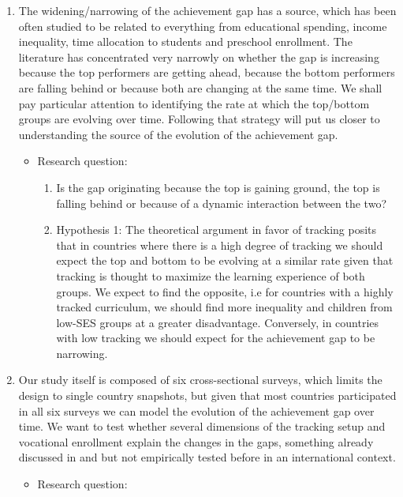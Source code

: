 \documentclass[11pt, a4paper]{article}\usepackage[]{graphicx}\usepackage[]{color}
\begin{document}
\begin{enumerate}
\item The widening/narrowing of the achievement gap has a source, which has been often studied to be related to everything from educational spending, income inequality, time allocation to students and preschool enrollment. The literature has concentrated very narrowly on whether the gap is increasing because the top performers are getting ahead, because the bottom performers are falling behind or because both are changing at the same time. We shall pay particular attention to identifying the rate at which the top/bottom groups are evolving over time. Following that strategy will put us closer to understanding the source of the evolution of the achievement gap. 

\begin{itemize}
\item Research question:
\begin{enumerate}

\item Is the gap originating because the top is gaining ground, the top is falling behind or because of a dynamic interaction between the two?

\item Hypothesis 1: The theoretical argument in favor of tracking posits that in countries where there is a high degree of tracking we should expect the top and bottom to be evolving at a similar rate given that tracking is thought to maximize the learning experience of both groups. We expect to find the opposite, i.e for countries with a highly tracked curriculum, we should find more inequality and children from low-SES groups at a greater disadvantage. Conversely, in countries with low tracking we should expect for the achievement gap to be narrowing.

\end{enumerate}
\end{itemize}

\item Our study itself is composed of six cross-sectional surveys, which limits the design to single country snapshots, but given that most countries participated in all six surveys we can model the evolution of the achievement gap over time. We want to test whether several dimensions of the tracking setup and vocational enrollment explain the changes in the gaps, something already discussed in \citet{werfhorst_mijs} and \citet{hanushek_woesmann_tracking} but not empirically tested before in an international context.

\begin{itemize}
\item Research question:
\begin{enumerate}


\end{enumerate}
\end{itemize}
\end{enumerate}
\end{document}
